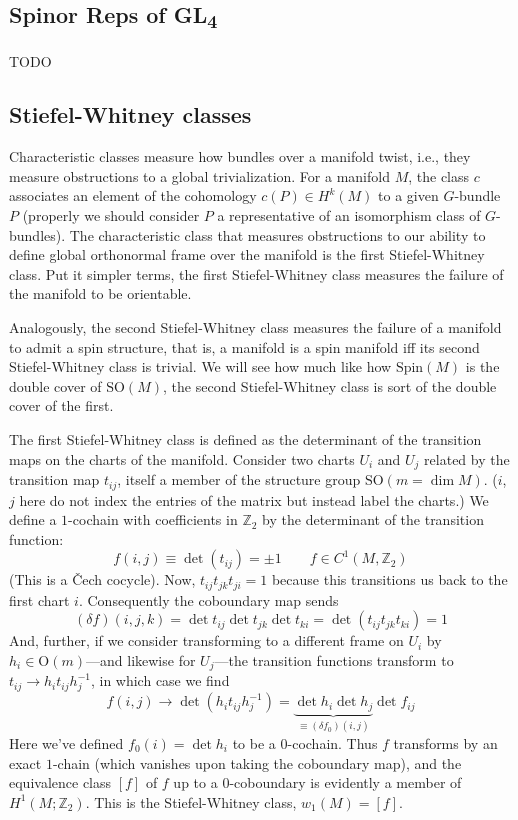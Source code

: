 \documentclass{report}
\begin{document}
\subsection{Spinor Reps of GL\textsubscript{4}}
TODO

\subsection{Stiefel-Whitney classes}
Characteristic classes measure how bundles over a manifold twist, i.e., they 
measure obstructions to a global trivialization.
For a manifold $ M $, the class $ c $ associates an element of the 
cohomology $ c(P)\in H^k(M) $ to a given $ G $-bundle $ P $ (properly we should 
consider $ P $ a representative of an isomorphism class of $ G $-bundles). 
The characteristic class that measures obstructions to our ability to define
global orthonormal frame over the manifold is the first Stiefel-Whitney class.
Put it simpler terms, the first Stiefel-Whitney class measures the failure of
the manifold to be orientable.

Analogously, the second Stiefel-Whitney class measures the failure of a manifold 
to admit a spin structure, that is, a manifold is a spin manifold iff its second
Stiefel-Whitney class is trivial. We will see how much like how $ \text{Spin}(M) $
is the double cover of $ \text{SO}(M) $, the second Stiefel-Whitney class is 
sort of the double cover of the first.

 The first Stiefel-Whitney class is defined as the 
determinant of the transition maps on the charts of the manifold. Consider two
charts $ U_i $ and $ U_j $ related by the transition map $ t_{ij} $, itself a
member of the structure group $ \text{SO}(m =\dim M) $. ($ i $, $ j $ here do
not index the entries of the matrix but instead label the charts.) We define a $
1 $-cochain with coefficients in $ \mathbb{Z}_2 $ by the determinant of the
transition function: 
\begin{equation*}
	f(i,j)\equiv \det(t_{ij})  = \pm 1\qquad f\in C^1(M, \mathbb{Z}_2)
\end{equation*}
(This is a \v{C}ech cocycle). Now, $ t_{ij}t_{jk}t_{ji} = 1 $ because this 
transitions us back to the first chart $ i $. Consequently the coboundary map 
sends 
\begin{equation*}
	(\delta f)(i,j,k) = \det t_{ij}  \det t_{jk}  \det t_{ki}
		= \det(t_{ij} t_{jk} t_{ki}) = 1
\end{equation*}
And, further, if we consider transforming to a different frame on $ U_i $ 
by $ h_i \in \text{O}(m)$---and likewise for $ U_j $---the transition functions 
transform to $ t_{ij}\rightarrow h_i t_{ij} h_j^{-1}$, in which case we find 
\begin{equation*}
	f(i,j) \rightarrow \det(h_i t_{ij} h_j^{-1}) = 
	\underbrace{\det h_i \det h_j}_{\equiv (\delta f_0)(i,j)}
	\det f_{ij}
\end{equation*}
Here we've defined $ f_0(i) = \det h_i $ to be a $ 0 $-cochain. Thus 
$ f $ transforms by an exact $ 1 $-chain (which vanishes upon taking the 
coboundary map), and the equivalence class $ [f] $ of $ f $ up to a $0$-coboundary 
is evidently a member of $ H^1(M;\mathbb{Z}_2) $. This is the Stiefel-Whitney 
class, $w_1(M)=[f]$. 
\end{document}
